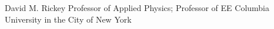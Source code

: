%
{David M. Rickey Professor of Applied Physics; Professor of EE}%
{Columbia University in the City of New York}%
{\quad{}}